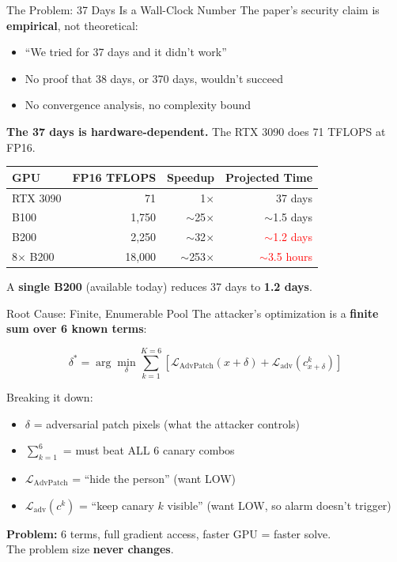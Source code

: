\documentclass[aspectratio=169,11pt]{beamer}
\begin{document}
\begin{frame}{The Problem: 37 Days Is a Wall-Clock Number}
The paper's security claim is \textbf{empirical}, not theoretical:
\begin{itemize}
    \item ``We tried for 37 days and it didn't work''
    \item No proof that 38 days, or 370 days, wouldn't succeed
    \item No convergence analysis, no complexity bound
\end{itemize}

\vspace{0.3cm}
\textbf{The 37 days is hardware-dependent.} The RTX 3090 does 71 TFLOPS at FP16.

\vspace{0.3cm}
\begin{table}
\centering
\small
\begin{tabular}{lrrr}
\toprule
\textbf{GPU} & \textbf{FP16 TFLOPS} & \textbf{Speedup} & \textbf{Projected Time} \\
\midrule
RTX 3090 & 71 & 1$\times$ & 37 days \\
B100 & 1,750 & $\sim$25$\times$ & $\sim$1.5 days \\
B200 & 2,250 & $\sim$32$\times$ & \textcolor{red}{$\sim$1.2 days} \\
8$\times$ B200 & 18,000 & $\sim$253$\times$ & \textcolor{red}{$\sim$3.5 hours} \\
\bottomrule
\end{tabular}
\end{table}

A \textbf{single B200} (available today) reduces 37 days to \textbf{1.2 days}.
\end{frame}

\begin{frame}{Root Cause: Finite, Enumerable Pool}
The attacker's optimization is a \textbf{finite sum over 6 known terms}:

\begin{equation*}
    \delta^* = \arg\min_\delta \sum_{k=1}^{K=6} \left[ \mathcal{L}_{\text{AdvPatch}}(x + \delta) + \mathcal{L}_{\text{adv}}(c^k_{x+\delta}) \right]
\end{equation*}

\vspace{0.3cm}
Breaking it down:
\begin{itemize}
    \item $\delta$ = adversarial patch pixels (what the attacker controls)
    \item $\sum_{k=1}^{6}$ = must beat ALL 6 canary combos
    \item $\mathcal{L}_{\text{AdvPatch}}$ = ``hide the person'' (want LOW)
    \item $\mathcal{L}_{\text{adv}}(c^k)$ = ``keep canary $k$ visible'' (want LOW, so alarm doesn't trigger)
\end{itemize}

\vspace{0.3cm}
\textbf{Problem:} 6 terms, full gradient access, faster GPU = faster solve.\\
The problem size \textbf{never changes}.
\end{frame}
\end{document}
